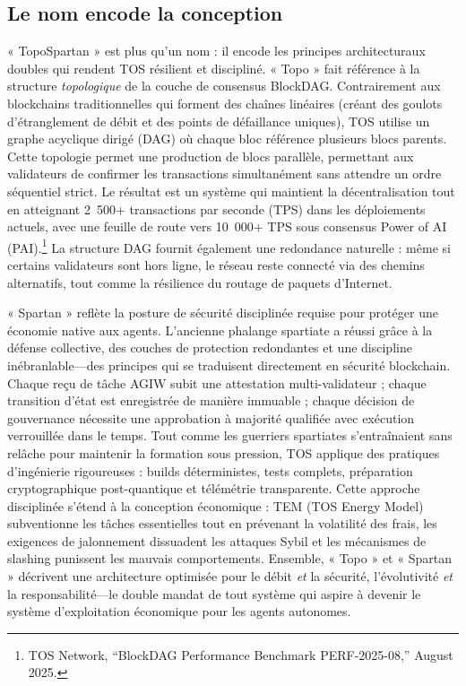 \documentclass[11pt]{article}
\begin{document}
\subsection{Le nom encode la conception}
« TopoSpartan » est plus qu'un nom : il encode les principes architecturaux doubles qui rendent TOS résilient et discipliné. « Topo » fait référence à la structure \emph{topologique} de la couche de consensus BlockDAG. Contrairement aux blockchains traditionnelles qui forment des chaînes linéaires (créant des goulots d'étranglement de débit et des points de défaillance uniques), TOS utilise un graphe acyclique dirigé (DAG) où chaque bloc référence plusieurs blocs parents. Cette topologie permet une production de blocs parallèle, permettant aux validateurs de confirmer les transactions simultanément sans attendre un ordre séquentiel strict. Le résultat est un système qui maintient la décentralisation tout en atteignant 2~500+ transactions par seconde (TPS) dans les déploiements actuels, avec une feuille de route vers 10~000+ TPS sous consensus Power of AI (PAI).\footnote{TOS Network, ``BlockDAG Performance Benchmark PERF-2025-08,'' August 2025.} La structure DAG fournit également une redondance naturelle : même si certains validateurs sont hors ligne, le réseau reste connecté via des chemins alternatifs, tout comme la résilience du routage de paquets d'Internet.

« Spartan » reflète la posture de sécurité disciplinée requise pour protéger une économie native aux agents. L'ancienne phalange spartiate a réussi grâce à la défense collective, des couches de protection redondantes et une discipline inébranlable---des principes qui se traduisent directement en sécurité blockchain. Chaque reçu de tâche AGIW subit une attestation multi-validateur ; chaque transition d'état est enregistrée de manière immuable ; chaque décision de gouvernance nécessite une approbation à majorité qualifiée avec exécution verrouillée dans le temps. Tout comme les guerriers spartiates s'entraînaient sans relâche pour maintenir la formation sous pression, TOS applique des pratiques d'ingénierie rigoureuses : builds déterministes, tests complets, préparation cryptographique post-quantique et télémétrie transparente. Cette approche disciplinée s'étend à la conception économique : TEM (TOS Energy Model) subventionne les tâches essentielles tout en prévenant la volatilité des frais, les exigences de jalonnement dissuadent les attaques Sybil et les mécanismes de slashing punissent les mauvais comportements. Ensemble, « Topo » et « Spartan » décrivent une architecture optimisée pour le débit \emph{et} la sécurité, l'évolutivité \emph{et} la responsabilité---le double mandat de tout système qui aspire à devenir le système d'exploitation économique pour les agents autonomes.
\end{document}
